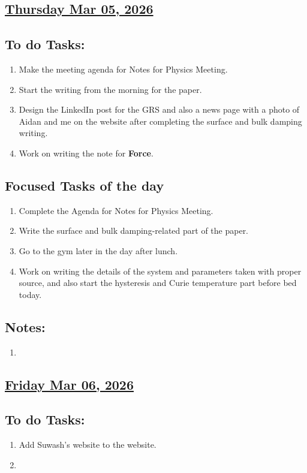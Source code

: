 \subsection*{\underline{Thursday Mar 05, 2026}}
\subsection*{To do Tasks:}
\begin{enumerate}
    \item Make the meeting agenda for Notes for Physics Meeting. \cmark
    \item Start the writing from the morning for the paper. \cmark
    \item Design the LinkedIn post for the GRS and also a news page with a photo of Aidan and me on the website after completing the surface and bulk damping writing.
    \item Work on writing the note for \textbf{Force}.
\end{enumerate}
\subsection*{Focused Tasks of the day}
\begin{enumerate}[\ding{212}]  
    \item Complete the Agenda for Notes for Physics Meeting. \cmark
    \item Write the surface and bulk damping-related part of the paper. \cmark 
    \item Go to the gym later in the day after lunch.
    \item Work on writing the details of the system and parameters taken with proper source, and also start the hysteresis and Curie temperature part before bed today.
\end{enumerate}
\subsection*{Notes:}
\begin{enumerate}
    \item 
\end{enumerate}
\subsection*{\underline{Friday Mar 06, 2026}}
\subsection*{To do Tasks:}
\begin{enumerate}
    \item Add Suwash's website to the website.
    \item 
\end{enumerate}
